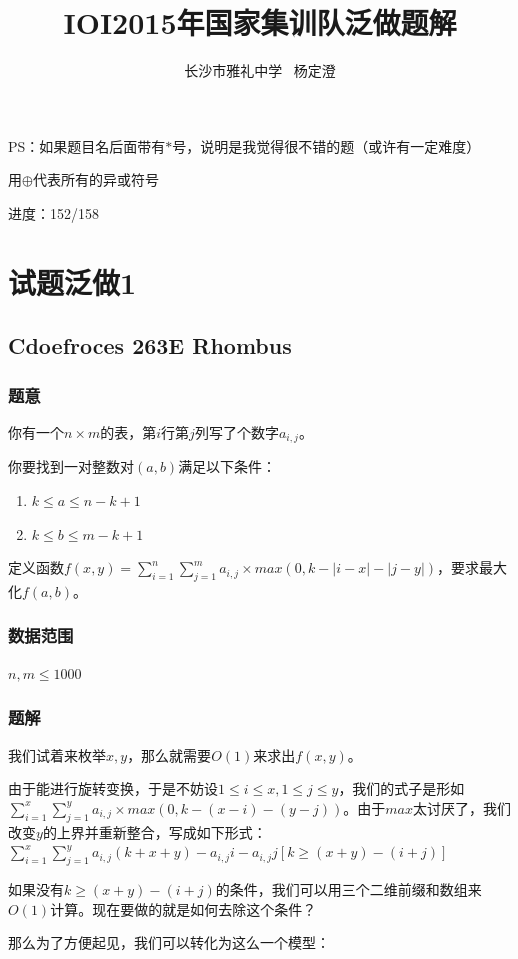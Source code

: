 \documentclass{ctexart}
\begin{document}
\title{\textbf{IOI2015年国家集训队泛做题解}}
\author{长沙市雅礼中学 \ 杨定澄}
\maketitle
PS：如果题目名后面带有$*$号，说明是我觉得很不错的题（或许有一定难度）

用$\oplus$代表所有的异或符号

进度：152/158
\tableofcontents
\newpage
\section{试题泛做1}
\subsection{Cdoefroces 263E Rhombus}
\subsubsection{题意}
你有一个$n \times m$的表，第$i$行第$j$列写了个数字$a_{i,j}$。

你要找到一对整数对$(a,b)$满足以下条件：
\begin{enumerate}
\item $k \le a \le n-k+1$
\item $k \le b \le m-k+1$
\end{enumerate}

定义函数$f(x,y)=\sum\limits_{i=1}^n\sum\limits_{j=1}^m a_{i,j}\times max(0,k-|i-x|-|j-y|)$，要求最大化$f(a,b)$。
\subsubsection{数据范围}
$n,m \le 1000$
\subsubsection{题解}
我们试着来枚举$x,y$，那么就需要$O(1)$来求出$f(x,y)$。

由于能进行旋转变换，于是不妨设$1\le i\le x,1 \le j \le y$，我们的式子是形如$\sum\limits_{i=1}^x\sum\limits_{j=1}^y a_{i,j}\times max(0,k-(x-i)-(y-j))$。由于$max$太讨厌了，我们改变$y$的上界并重新整合，写成如下形式：$\sum\limits_{i=1}^x \sum\limits_{j=1}^ya_{i,j} (k+x+y)-a_{i,j} i-a_{i,j} j[k \ge (x+y)-(i+j)]$

如果没有$k \ge (x+y)-(i+j)$的条件，我们可以用三个二维前缀和数组来$O(1)$计算。现在要做的就是如何去除这个条件？

那么为了方便起见，我们可以转化为这么一个模型：
\end{document}
